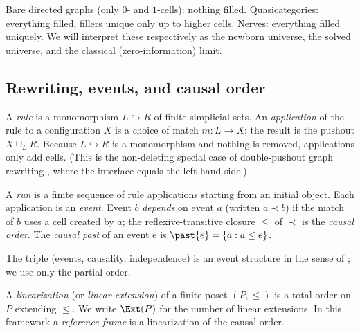 \begin{remark}
Bare directed graphs (only $0$- and $1$-cells): nothing filled.
Quasicategories: everything filled, fillers unique only up to higher cells.
Nerves: everything filled uniquely. We will interpret these respectively as
the newborn universe, the solved universe, and the classical
(zero-information) limit.
\end{remark}

\subsection{Rewriting, events, and causal order}

\begin{definition}
A \emph{rule} is a monomorphism $L \hookrightarrow R$ of finite simplicial
sets. An \emph{application} of the rule to a configuration $X$ is a choice of
match $m : L \to X$; the result is the pushout $X \cup_L R$. Because $L
\hookrightarrow R$ is a monomorphism and nothing is removed, applications
only add cells. (This is the non-deleting special case of double-pushout
graph rewriting \citep{ehrig2006dpo}, where the interface equals the
left-hand side.)
\end{definition}

\begin{definition}
\label{def:causalorder}
A \emph{run} is a finite sequence of rule applications starting from an
initial object. Each application is an \emph{event}. Event $b$ \emph{depends}
on event $a$ (written $a \prec b$) if the match of $b$ uses a cell created by
$a$; the reflexive-transitive closure $\le$ of $\prec$ is the \emph{causal
order}. The \emph{causal past} of an event $e$ is
$\past{e} = \{a : a \le e\}$.
\end{definition}

\begin{remark}
The triple (events, causality, independence) is an event structure in the
sense of \citet{winskel1986event}; we use only the partial order.
\end{remark}

\begin{definition}
A \emph{linearization} (or \emph{linear extension}) of a finite poset
$(P,\le)$ is a total order on $P$ extending $\le$. We write $\Ext(P)$ for the
number of linear extensions. In this framework a \emph{reference frame} is a
linearization of the causal order.
\end{definition}

